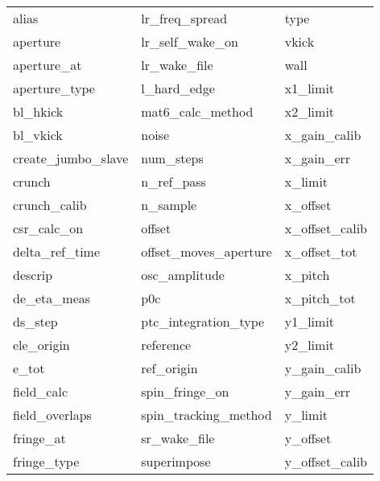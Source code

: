  \begin{tabular}{lll} \toprule
alias                       & lr_freq_spread              & type                        \\
aperture                    & lr_self_wake_on             & vkick                       \\
aperture_at                 & lr_wake_file                & wall                        \\
aperture_type               & l_hard_edge                 & x1_limit                    \\
bl_hkick                    & mat6_calc_method            & x2_limit                    \\
bl_vkick                    & noise                       & x_gain_calib                \\
create_jumbo_slave          & num_steps                   & x_gain_err                  \\
crunch                      & n_ref_pass                  & x_limit                     \\
crunch_calib                & n_sample                    & x_offset                    \\
csr_calc_on                 & offset                      & x_offset_calib              \\
delta_ref_time              & offset_moves_aperture       & x_offset_tot                \\
descrip                     & osc_amplitude               & x_pitch                     \\
de_eta_meas                 & p0c                         & x_pitch_tot                 \\
ds_step                     & ptc_integration_type        & y1_limit                    \\
ele_origin                  & reference                   & y2_limit                    \\
e_tot                       & ref_origin                  & y_gain_calib                \\
field_calc                  & spin_fringe_on              & y_gain_err                  \\
field_overlaps              & spin_tracking_method        & y_limit                     \\
fringe_at                   & sr_wake_file                & y_offset                    \\
fringe_type                 & superimpose                 & y_offset_calib              \\

\end{tabular}

